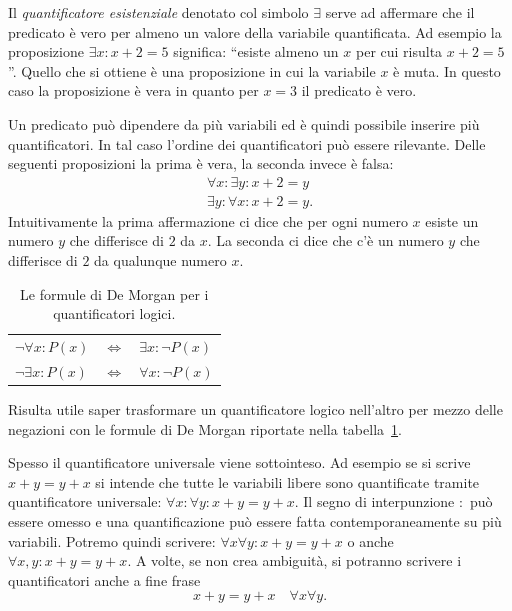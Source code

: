 Il \emph{quantificatore esistenziale}%
%
 denotato col simbolo
$\exists$ serve ad affermare che il predicato è vero per
almeno un valore della variabile quantificata.
Ad esempio la proposizione $\exists x\colon x+2=5$ significa:
``esiste almeno un $x$ per cui risulta $x+2=5$''.
Quello che si ottiene è una proposizione in cui la variabile
$x$ è muta. In questo caso la proposizione è vera in quanto
per $x=3$ il predicato è vero.

Un predicato può dipendere da più variabili ed è quindi
possibile inserire più quantificatori. In tal caso l'ordine
dei quantificatori può essere rilevante.
Delle seguenti proposizioni la prima è vera, la seconda
invece è falsa:
\begin{gather*}
\forall x\colon \exists y\colon x+2=y \\
\exists y\colon \forall x\colon x+2=y.
\end{gather*}
Intuitivamente la prima affermazione ci dice che per ogni numero $x$ 
esiste un numero $y$ che differisce di $2$ da $x$.
La seconda ci dice che c'è un numero $y$ che differisce di $2$ 
da qualunque numero $x$.

\begin{table}
  \begin{center}
    \begin{tabular}{lcl}
    $\lnot \forall x \colon P(x)$ & $\iff$ & $\exists x \colon \lnot P(x)$\\
    $\lnot \exists x \colon P(x)$ & $\iff$ & $\forall x \colon \lnot P(x)$\\
    \end{tabular}
  \end{center}
  \caption{Le formule di De Morgan per i quantificatori logici.}
  \label{tab:proprieta_quantificatori}
\end{table}

Risulta utile saper trasformare un quantificatore logico
nell'altro per mezzo delle negazioni con le formule 
di De Morgan riportate
nella tabella~\ref{tab:proprieta_quantificatori}.

Spesso il quantificatore universale viene sottointeso.
Ad esempio se si scrive $x+y=y+x$
si intende che tutte le variabili libere sono quantificate 
tramite quantificatore universale: 
$\forall x\colon \forall y\colon x+y=y+x$.
Il segno di interpunzione $\colon$ può essere omesso
e una quantificazione può essere fatta contemporaneamente 
su più variabili. 
Potremo quindi scrivere: $\forall x\forall y\colon x+y=y+x$ 
o anche $\forall x,y\colon x+y = y+x$.
A volte, se non crea ambiguità, si potranno scrivere 
i quantificatori anche a fine frase 
\[
  x+y=y+x \quad \forall x\forall y.
\]

